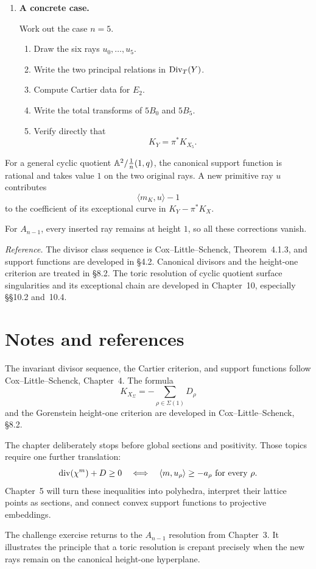 \begin{enumerate}[label=\textbf{Hint \arabic*.},wide=0pt]
\item \textbf{A concrete case.}

Work out the case \(n=5\).

\begin{enumerate}[label=(\alph*),wide=0pt]
\item Draw the six rays \(u_0,\ldots,u_5\).
\item Write the two principal relations in
\(\operatorname{Div}_T(Y)\).
\item Compute Cartier data for \(E_2\).
\item Write the total transforms of \(5B_0\) and \(5B_5\).
\item Verify directly that
\[
K_Y=\pi^*K_{X_5}.
\]
\end{enumerate}

\end{enumerate}

\begin{tcolorbox}[
  colback=PredictionTeal!5,
  colframe=PredictionTeal,
  title={Beyond the \(A_{n-1}\) case},
  fonttitle=\bfseries
]
For a general cyclic quotient
\(\mathbb{A}^2/\tfrac1n(1,q)\), the canonical support function is rational
and takes value \(1\) on the two original rays. A new primitive ray
\(u\) contributes
\[
\langle m_K,u\rangle-1
\]
to the coefficient of its exceptional curve in
\(K_Y-\pi^*K_X\).

For \(A_{n-1}\), every inserted ray remains at height \(1\), so all
these corrections vanish.
\end{tcolorbox}

\noindent
\textit{Reference.}
The divisor class sequence is Cox--Little--Schenck,
Theorem~4.1.3, and support functions are developed in \S4.2.
Canonical divisors and the height-one criterion are treated in
\S8.2. The toric resolution of cyclic quotient surface singularities
and its exceptional chain are developed in Chapter~10, especially
\S\S10.2 and~10.4.

\clearpage
\section*{Notes and references}

The invariant divisor sequence, the Cartier criterion, and support
functions follow Cox--Little--Schenck, Chapter~4. The formula
\[
K_{X_\Sigma}
=
-\sum_{\rho\in\Sigma(1)}D_\rho
\]
and the Gorenstein height-one criterion are developed in
Cox--Little--Schenck, \S8.2.

The chapter deliberately stops before global sections and positivity.
Those topics require one further translation:
\[
\operatorname{div}(\chi^{m})+D\geq0
\quad\Longleftrightarrow\quad
\langle m,u_\rho\rangle\geq-a_\rho
\text{ for every }\rho.
\]
Chapter~5 will turn these inequalities into polyhedra, interpret their
lattice points as sections, and connect convex support functions to
projective embeddings.

The challenge exercise returns to the \(A_{n-1}\) resolution from
Chapter~3. It illustrates the principle that a toric resolution is
crepant precisely when the new rays remain on the canonical
height-one hyperplane.
